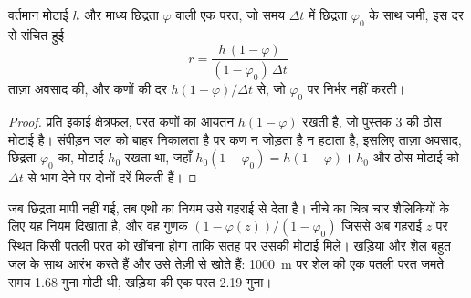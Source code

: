 \begin{proposition}\label{prop:b2:palaeoenvironments:rate}
वर्तमान मोटाई $h$ और माध्य छिद्रता $\varphi$ वाली एक परत, जो समय $\Delta t$ में
छिद्रता $\varphi_0$ के साथ जमी, इस दर से संचित हुई
\[
  r = \frac{h\,(1 - \varphi)}{(1 - \varphi_0)\,\Delta t}
\]
ताज़ा अवसाद की, और कणों की दर $h(1-\varphi)/\Delta t$ से, जो
$\varphi_0$ पर निर्भर नहीं करती।
\end{proposition}

\begin{proof}
प्रति इकाई क्षेत्रफल, परत कणों का आयतन $h(1 - \varphi)$ रखती है, जो पुस्तक 3 की ठोस मोटाई
है। संपीड़न जल को बाहर निकालता है पर कण न जोड़ता है न हटाता है, इसलिए ताज़ा
अवसाद, छिद्रता $\varphi_0$ का, मोटाई $h_0$ रखता था, जहाँ $h_0(1 - \varphi_0) = h(1 -
\varphi)$। $h_0$ और ठोस मोटाई को $\Delta t$ से भाग देने पर दोनों दरें मिलती हैं।
\end{proof}

जब छिद्रता मापी नहीं गई, तब एथी का नियम उसे गहराई से देता है। नीचे का चित्र
चार शैलिकियों के लिए यह नियम दिखाता है, और वह गुणक $(1 - \varphi(z))/(1 - \varphi_0)$ जिससे अब गहराई $z$ पर स्थित किसी पतली
परत को खींचना होगा ताकि सतह पर उसकी मोटाई मिले। खड़िया और शेल
बहुत जल के साथ आरंभ करते हैं और उसे तेज़ी से खोते हैं: \qty{1000}{m} पर शेल की एक पतली परत जमते समय 1.68 गुना
मोटी थी, खड़िया की एक परत 2.19 गुना।

